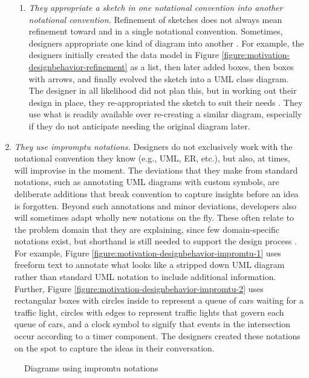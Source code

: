 \documentclass[12pt,fleqn]{ucithesis}
\begin{document}
\begin{enumerate}
\begin{enumerate}
\item \emph{They appropriate a sketch in one notational convention into another notational convention.} Refinement of sketches does not always mean refinement toward and in a single notational convention. Sometimes, designers appropriate one kind of diagram into another \citep{dekel2007notation}. For example, the designers initially created the data model in Figure \ref{figure:motivation-designbehavior-refinement} as a list, then later added boxes, then boxes with arrows, and finally evolved the sketch into a UML class diagram. The designer in all likelihood did not plan this, but in working out their design in place, they re-appropriated the sketch to suit their needs \citep{mangano2012design}. They use what is readily available over re-creating a similar diagram, especially if they do not anticipate needing the original diagram later. 
 \end{enumerate}

\item \emph{They use impromptu notations.} Designers do not exclusively work with the notational convention they know (e.g., UML, ER, etc.), but also, at times, will improvise in the moment. The deviations that they make from standard notations, such as annotating UML diagrams with custom symbols, are deliberate additions that break convention to capture insights before an idea is forgotten. Beyond such annotations and minor deviations, developers also will sometimes adapt wholly new notations on the fly. These often relate to the problem domain that they are explaining, since few domain-specific notations exist, but shorthand is still needed to support the design process \cite{dekel2007notation}. For example, Figure \ref{figure:motivation-designbehavior-impromtu-1} uses freeform text to annotate what looks like a stripped down UML diagram rather than standard UML notation to include additional information. Further, Figure \ref{figure:motivation-designbehavior-impromtu-2} uses rectangular boxes with circles inside to represent a queue of cars waiting for a traffic light, circles with edges to represent traffic lights that govern each queue of cars, and a clock symbol to signify that events in the intersection occur according to a timer component. The designers created these notations on the spot to capture the ideas in their conversation. 

\end{enumerate}

\begin{figure}
  \centering
   \caption {Diagrams using impromtu notations}
   \label{figure:motivation-designbehavior-impromtu}
\end{figure}
\end{document}
